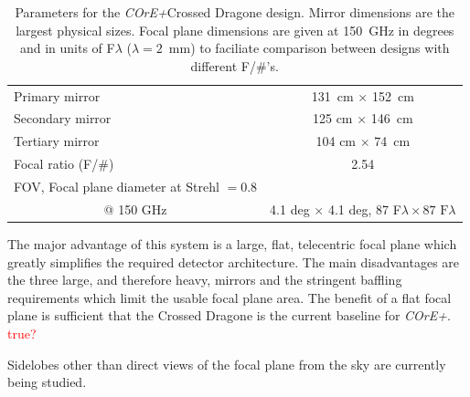 \documentclass[11pt,a4paper]{article}
\newcommand{\comred}[1]{\textcolor{red}{#1}}
\newcommand{\coreplus}{\textit{\negthinspace COrE+\/}}
\begin{document}
\begin{table}[h!]
	\centering
	\begin{tabular}{|l|c|}
		\hline
		Primary mirror   & 131~cm $\times$ 152~cm   \\
		Secondary mirror   & 125 cm $\times$ 146~cm  \\
		Tertiary mirror  & 104 cm $\times$ 74~cm    \\
		Focal ratio (F/\#)               & 2.54   \\
		\multicolumn{1}{|l|}{FOV, Focal plane diameter at Strehl $= 0.8$} & \\
		\multicolumn{1}{|c|}{@ 150 GHz}    & 4.1 deg $\times$ 4.1 deg, 87 F$\lambda \times 87 \text{~F}\lambda$ \\
		\hline
		
	\end{tabular}
	\caption{Parameters for the \coreplus Crossed Dragone design.  Mirror dimensions are the largest physical sizes.  Focal 
		plane dimensions are given at 150~GHz in degrees and in units of F$\lambda$ ($\lambda=2$~mm) to faciliate comparison between 
		designs with different F/\#'s. }
	\label{tab:mirrors}
	
\end{table}

The major advantage of this system is a large, flat, telecentric focal plane which greatly simplifies 
the required detector architecture.  The main disadvantages are the three large, and therefore heavy, 
mirrors and the stringent baffling requirements which limit the usable focal plane area.  The benefit of 
a flat focal plane is sufficient that the Crossed Dragone is the current baseline for \coreplus. \comred{true?}

Sidelobes 
other than direct views of the focal plane from 
the sky are currently being studied.



\end{document}
